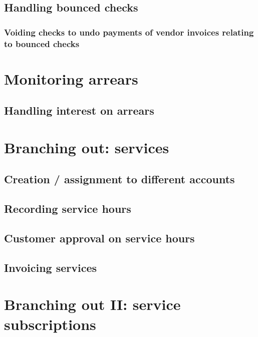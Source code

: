 \section{Handling bounced checks}
\label{sec-vendor-invoice-bounced-checks}

\subsection{Voiding checks to undo payments of vendor invoices
 relating to bounced checks}



\chapter{Monitoring arrears}
\label{cha-starting-monitoring-arrears}

\section{Handling interest on arrears}
\label{sec-monitoring-interest-on-arrears}



\chapter{Branching out: services}
\label{cha-starting-branch-to-services}

\section{Creation / assignment to different accounts}
\label{sec-starting-services-assignment}

\section{Recording service hours}
\label{sec-starting-services-writing-hours}

\section{Customer approval on service hours}
\label{sec-starting-services-hours-customer-approval}

\section{Invoicing services}
\label{sec-starting-services-invoicing}

\chapter{Branching out II: service subscriptions}
\label{cha-starting-services-subscriptions}


